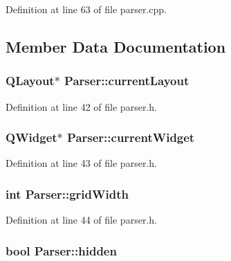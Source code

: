 Definition at line 63 of file parser.cpp.



\subsection{Member Data Documentation}
\hypertarget{classParser_a3b94abe3e2c41c419f5be2a2e3fd63a4}{
\subsubsection[{currentLayout}]{\setlength{\rightskip}{0pt plus 5cm}QLayout$\ast$ {\bf Parser::currentLayout}}}
\label{classParser_a3b94abe3e2c41c419f5be2a2e3fd63a4}


Definition at line 42 of file parser.h.

\hypertarget{classParser_a05d665391ab1db7f4729654df9fa4079}{
\subsubsection[{currentWidget}]{\setlength{\rightskip}{0pt plus 5cm}QWidget$\ast$ {\bf Parser::currentWidget}}}
\label{classParser_a05d665391ab1db7f4729654df9fa4079}


Definition at line 43 of file parser.h.

\hypertarget{classParser_a52e6fad38b265e732b7667aab6648472}{
\subsubsection[{gridWidth}]{\setlength{\rightskip}{0pt plus 5cm}int {\bf Parser::gridWidth}}}
\label{classParser_a52e6fad38b265e732b7667aab6648472}


Definition at line 44 of file parser.h.

\hypertarget{classParser_a24d2c0cb2595e44b9a7f73d801685e70}{
\subsubsection[{hidden}]{\setlength{\rightskip}{0pt plus 5cm}bool {\bf Parser::hidden}}}
\label{classParser_a24d2c0cb2595e44b9a7f73d801685e70}


